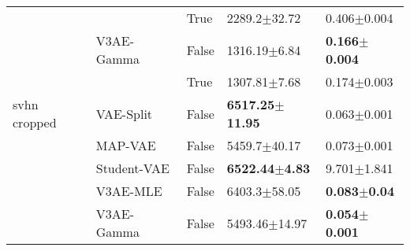 \begin{tabular}{lllll}
             &            & True  &            2289.2$\pm$32.72 &           0.406$\pm$0.004 \\
             & V3AE-Gamma & False &            1316.19$\pm$6.84 &  \textbf{0.166$\pm$0.004} \\
             &            & True  &            1307.81$\pm$7.68 &           0.174$\pm$0.003 \\
svhn cropped & VAE-Split & False &  \textbf{6517.25$\pm$11.95} &           0.063$\pm$0.001 \\
             & MAP-VAE & False &            5459.7$\pm$40.17 &           0.073$\pm$0.001 \\
             & Student-VAE & False &   \textbf{6522.44$\pm$4.83} &           9.701$\pm$1.841 \\
             & V3AE-MLE & False &            6403.3$\pm$58.05 &   \textbf{0.083$\pm$0.04} \\
             & V3AE-Gamma & False &           5493.46$\pm$14.97 &  \textbf{0.054$\pm$0.001} \\
\bottomrule
\end{tabular}

